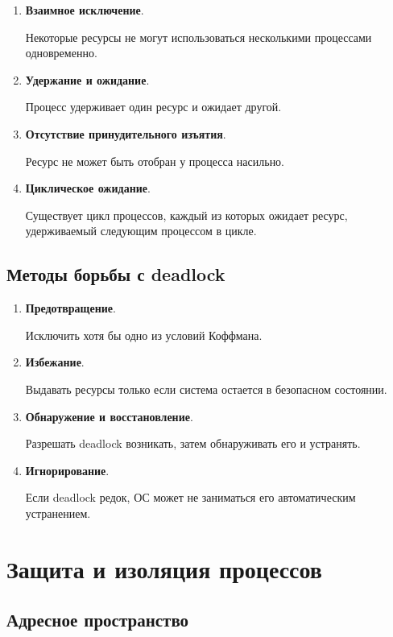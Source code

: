 \documentclass[12pt,a4paper]{article}
\begin{document}
\begin{enumerate}
    \item \textbf{Взаимное исключение}.

    Некоторые ресурсы не могут использоваться несколькими процессами одновременно.

    \item \textbf{Удержание и ожидание}.

    Процесс удерживает один ресурс и ожидает другой.

    \item \textbf{Отсутствие принудительного изъятия}.

    Ресурс не может быть отобран у процесса насильно.

    \item \textbf{Циклическое ожидание}.

    Существует цикл процессов, каждый из которых ожидает ресурс, удерживаемый следующим процессом в цикле.
\end{enumerate}

\subsection{Методы борьбы с deadlock}

\begin{enumerate}
    \item \textbf{Предотвращение}.

    Исключить хотя бы одно из условий Коффмана.

    \item \textbf{Избежание}.

    Выдавать ресурсы только если система остается в безопасном состоянии.

    \item \textbf{Обнаружение и восстановление}.

    Разрешать deadlock возникать, затем обнаруживать его и устранять.

    \item \textbf{Игнорирование}.

    Если deadlock редок, ОС может не заниматься его автоматическим устранением.
\end{enumerate}

\section{Защита и изоляция процессов}

\subsection{Адресное пространство}
\end{document}
